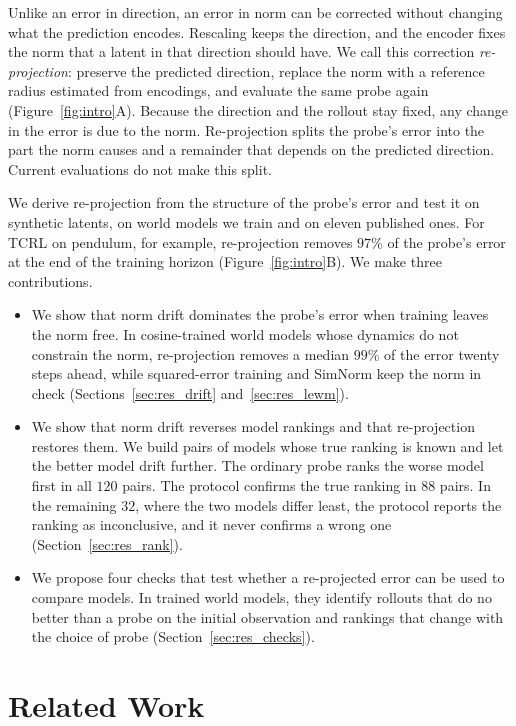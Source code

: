 Unlike an error in direction, an error in norm can be corrected without changing what the prediction encodes. Rescaling keeps the direction, and the encoder fixes the norm that a latent in that direction should have. We call this correction \emph{re-projection}: preserve the predicted direction, replace the norm with a reference radius estimated from encodings, and evaluate the same probe again (Figure~\ref{fig:intro}A). Because the direction and the rollout stay fixed, any change in the error is due to the norm. Re-projection splits the probe's error into the part the norm causes and a remainder that depends on the predicted direction. Current evaluations do not make this split.

We derive re-projection from the structure of the probe's error and test it on synthetic latents, on world models we train and on eleven published ones. For TCRL on pendulum, for example, re-projection removes $97$\% of the probe's error at the end of the training horizon (Figure~\ref{fig:intro}B). We make three contributions.
\begin{itemize}
\item We show that norm drift dominates the probe's error when training leaves the norm free. In cosine-trained world models whose dynamics do not constrain the norm, re-projection removes a median $99$\% of the error twenty steps ahead, while squared-error training and SimNorm keep the norm in check (Sections~\ref{sec:res_drift} and~\ref{sec:res_lewm}).
\item We show that norm drift reverses model rankings and that re-projection restores them. We build pairs of models whose true ranking is known and let the better model drift further. The ordinary probe ranks the worse model first in all $120$ pairs. The protocol confirms the true ranking in $88$ pairs. In the remaining $32$, where the two models differ least, the protocol reports the ranking as inconclusive, and it never confirms a wrong one (Section~\ref{sec:res_rank}).
\item We propose four checks that test whether a re-projected error can be used to compare models. In trained world models, they identify rollouts that do no better than a probe on the initial observation and rankings that change with the choice of probe (Section~\ref{sec:res_checks}).
\end{itemize}

\section{Related Work}
\label{sec:related}
